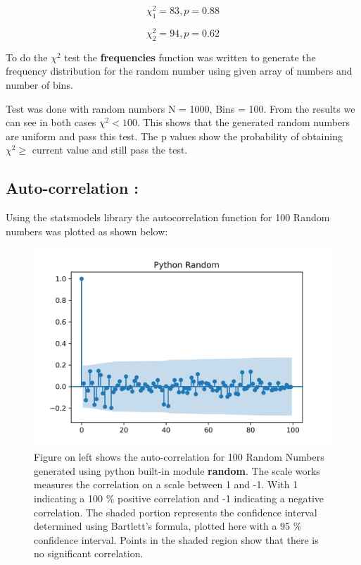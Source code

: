 \documentclass{article}
\begin{document}
\begin{equation}
    \chi^2_1 = 83, p=0.88 
\end{equation}

\begin{equation}
    \chi^2_2 = 94, p=0.62
\end{equation}


To do the $ \chi^2 $ test the \textbf{frequencies} function was written to generate the frequency 
distribution for the random number using given array of numbers and number of bins. 

Test was done with random numbers N = 1000, Bins = 100. From the results we can see in both cases 
$ \chi^2 < 100 $. This shows that the generated random numbers are uniform 
and pass this test. The p values show the probability of obtaining $ \chi^2 \geq $  
current value and still pass the test. 

\subsection{Auto-correlation :}
Using the statsmodels library the autocorrelation function for 100 Random numbers was plotted
as shown below:

    \begin{figure}[h]
        \begin{minipage}[c]{0.5\textwidth}
        \includegraphics[width=\textwidth]{task1a1.png}
        \end{minipage}\hfill
        \begin{minipage}[c]{0.5\textwidth}
        \caption{
            Figure on left shows the auto-correlation for 100 Random Numbers generated using python
            built-in module \textbf{random}.
            The scale works measures the correlation on a scale 
            between 1 and -1. With 1 indicating a 100 \% positive correlation and -1 indicating a negative 
            correlation. The shaded portion represents the confidence interval determined using 
            Bartlett's formula, plotted here with a 95 \% confidence interval. Points in the shaded 
            region show that there is no significant correlation.
        } \label{fig:2a}
        \end{minipage}
    \end{figure}
\end{document}
